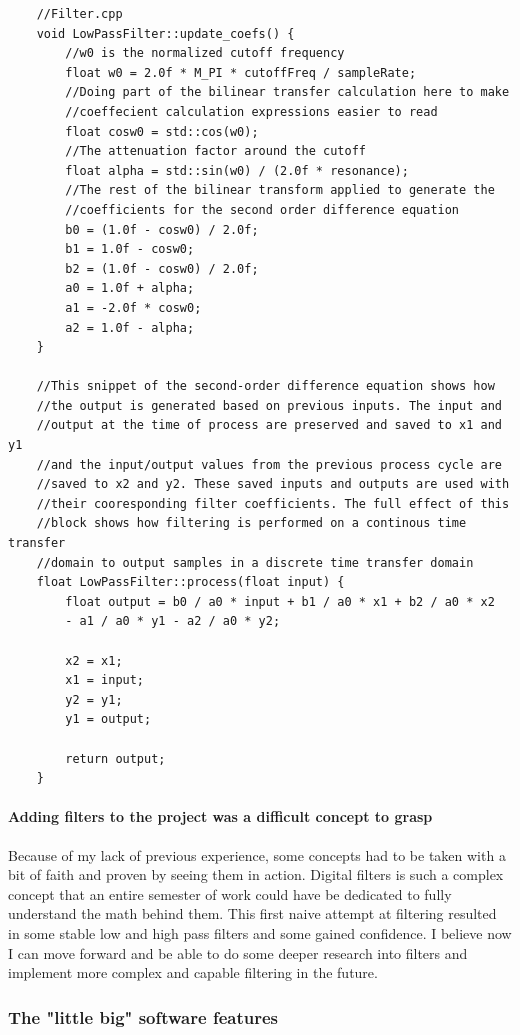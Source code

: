 \documentclass[acmlarge,screen]{acmart}
\begin{document}
	\begin{verbatim}
	//Filter.cpp
	void LowPassFilter::update_coefs() {
		//w0 is the normalized cutoff frequency
		float w0 = 2.0f * M_PI * cutoffFreq / sampleRate;
		//Doing part of the bilinear transfer calculation here to make
		//coeffecient calculation expressions easier to read
		float cosw0 = std::cos(w0); 
		//The attenuation factor around the cutoff
		float alpha = std::sin(w0) / (2.0f * resonance); 
		//The rest of the bilinear transform applied to generate the 
		//coefficients for the second order difference equation
		b0 = (1.0f - cosw0) / 2.0f;
		b1 = 1.0f - cosw0;
		b2 = (1.0f - cosw0) / 2.0f;
		a0 = 1.0f + alpha;
		a1 = -2.0f * cosw0;
		a2 = 1.0f - alpha;
	}
	
	//This snippet of the second-order difference equation shows how
	//the output is generated based on previous inputs. The input and
	//output at the time of process are preserved and saved to x1 and y1
	//and the input/output values from the previous process cycle are
	//saved to x2 and y2. These saved inputs and outputs are used with
	//their cooresponding filter coefficients. The full effect of this
	//block shows how filtering is performed on a continous time transfer
	//domain to output samples in a discrete time transfer domain
	float LowPassFilter::process(float input) {
		float output = b0 / a0 * input + b1 / a0 * x1 + b2 / a0 * x2
		- a1 / a0 * y1 - a2 / a0 * y2;
		
		x2 = x1;
		x1 = input;
		y2 = y1;
		y1 = output;
		
		return output;
	}
	\end{verbatim}

	\paragraph{Adding filters to the project was a difficult concept to grasp} Because of my lack of previous experience, some concepts had to be taken with a bit of faith and proven by seeing them in action. Digital filters is such a complex concept that an entire semester of work could have be dedicated to fully understand the math behind them. This first naive attempt at filtering resulted in some stable low and high pass filters and some gained confidence. I believe now I can move forward and be able to do some deeper research into filters and implement more complex and capable filtering in the future.
	
	\clearpage
	
	\subsubsection{The "little big" software features}
\end{document}
